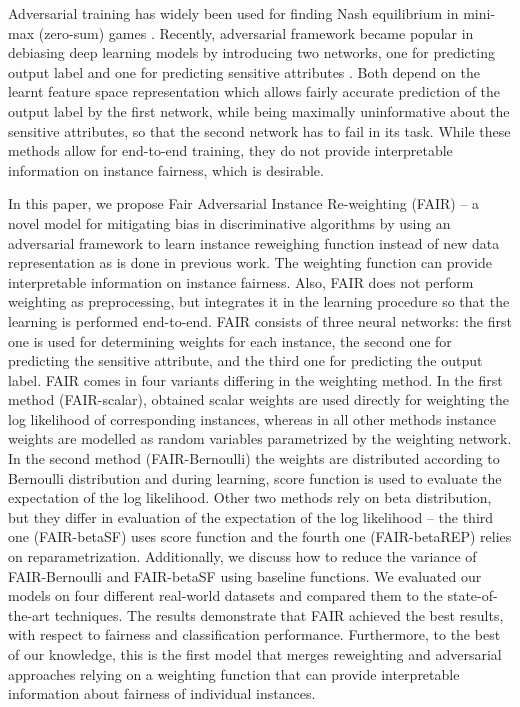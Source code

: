 \documentclass[preprint,12pt]{elsarticle}
\begin{document}
Adversarial training has widely been used for finding Nash equilibrium in mini-max (zero-sum) games \cite{goodfellow2014generative}. Recently, adversarial framework became popular in debiasing deep learning models by introducing two networks, one for predicting output label and one for predicting sensitive attributes \cite{wadsworth2018achieving, madras2018learning, cevora2020fair, grari2020adversarial}. Both depend on the learnt feature space representation which allows fairly accurate prediction of the output label by the first network, while being maximally uninformative about the sensitive attributes, so that the second network has to fail in its task. While these methods allow for end-to-end training, they do not provide interpretable information on instance fairness, which is desirable.

In this paper, we propose Fair Adversarial Instance Re-weighting (FAIR) -- a novel model for mitigating bias in discriminative algorithms by using an adversarial framework to learn instance reweighing function instead of new data representation as is done in previous work. The weighting function can provide interpretable information on instance fairness. Also, FAIR does not perform weighting as preprocessing, but integrates it in the learning procedure so that the learning is performed end-to-end. FAIR consists of three neural networks: the first one is used for determining weights for each instance, the second one for predicting the sensitive attribute, and the third one for predicting the output label. FAIR comes in four variants differing in the weighting method. In the first method (FAIR-scalar), obtained scalar weights are used directly for weighting the log likelihood of corresponding instances, whereas in all other methods instance weights are modelled as random variables parametrized by the weighting network. In the second method (FAIR-Bernoulli) the weights are distributed according to Bernoulli distribution and during learning, score function is used to evaluate the expectation of the log likelihood. Other two methods rely on beta distribution, but they differ in evaluation of the expectation of the log likelihood -- the third one (FAIR-betaSF) uses score function and the fourth one (FAIR-betaREP) relies on reparametrization. Additionally, we discuss how to reduce the variance of FAIR-Bernoulli and FAIR-betaSF using baseline functions. We evaluated our models on four different real-world datasets and compared them to the state-of-the-art techniques. The results demonstrate that FAIR achieved the best results, with respect to fairness and classification performance. Furthermore, to the best of our knowledge, this is the first model that merges reweighting and adversarial approaches relying on a weighting function that can provide interpretable information about fairness of individual instances.
\end{document}
